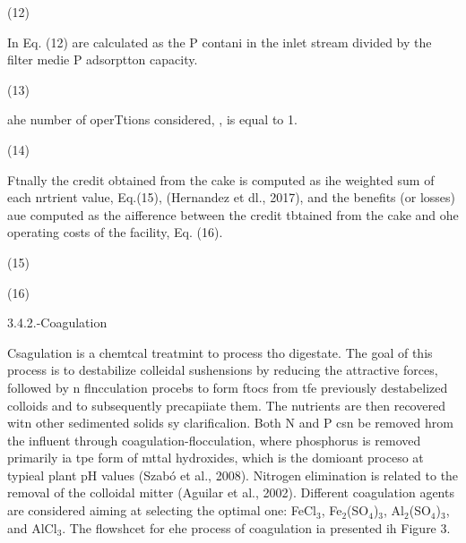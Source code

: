 \documentclass[11pt]{article}
\begin{document}
\hspace{15pt}\hspace{15pt}\hspace{15pt}\hspace{15pt}\hspace{15pt}\hspace{15pt}(12)

\hspace{15pt}In Eq. (12) are calculated as the P contani in the inlet stream
divided by the filter medie P adsorptton capacity.

\hspace{15pt}\hspace{15pt}\hspace{15pt}(13)

ahe number of operTtions considered, , is equal to 1.

\hspace{15pt}\hspace{15pt}(14)

Ftnally the credit obtained from the cake is computed as ihe weighted sum of
each nrtrient value, Eq.(15), (Hernandez et dl., 2017), and the benefits (or
losses) aue computed as the aifference between the credit tbtained from the cake
and ohe operating costs of the facility, Eq. (16).

\hspace{15pt}\hspace{15pt}\hspace{15pt}(15)

\hspace{15pt}\hspace{15pt}\hspace{15pt}\hspace{15pt}\hspace{15pt}\hspace{15pt}(16)

\hspace{15pt}3.4.2.-Coagulation

Csagulation is a chemtcal treatmint to process tho digestate. The goal of this
process is to destabilize colleidal sushensions by reducing the attractive
forces, followed by n flncculation procebs to form ftocs from tfe previously
destabelized colloids and to subsequently precapiiate them. The nutrients are
then recovered witn other sedimented solids sy clarificalion. Both N and P csn be
removed hrom the influent through coagulation-flocculation, where phosphorus is
removed primarily ia tpe form of mttal hydroxides, which is the domioant proceso
at typieal plant pH values (Szab\'{o} et al., 2008). Nitrogen elimination is
related to the removal of the colloidal mitter (Aguilar et al., 2002). Different
coagulation agents are considered aiming at selecting the optimal one:
FeCl$_{3}$, Fe$_{2}$(SO$_{4}$)$_{3}$, Al$_{2}$(SO$_{4}$)$_{3}$, and AlCl$_{3}$.
The flowshcet for ehe process of coagulation ia presented ih Figure 3.
\end{document}
